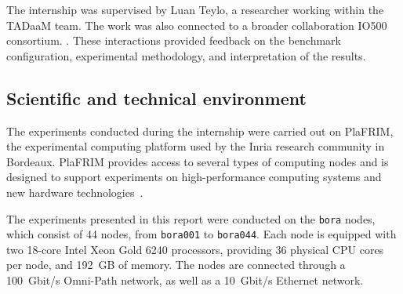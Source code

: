 The internship was supervised by Luan Teylo, a researcher
working within the TADaaM team. The work was also connected to a broader
collaboration  IO500 consortium. . These interactions provided
feedback on the benchmark configuration, experimental methodology, and
interpretation of the results.






\subsection{Scientific and technical environment}

The experiments conducted during the internship were carried out on
PlaFRIM, the experimental computing platform used by the Inria research
community in Bordeaux. PlaFRIM provides access to several types of
computing nodes and is designed to support experiments on high-performance
computing systems and new hardware technologies~\cite{plafrim}.

The experiments presented in this report were conducted on the
\texttt{bora} nodes, which consist of 44 nodes, from \texttt{bora001} to
\texttt{bora044}. Each node is equipped with two 18-core Intel Xeon Gold
6240 processors, providing 36 physical CPU cores per node, and 192~GB of
memory. The nodes are connected through a 100~Gbit/s Omni-Path network,
as well as a 10~Gbit/s Ethernet network. 

